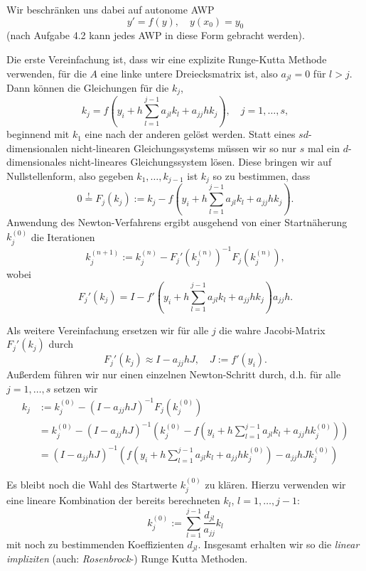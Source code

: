 \documentclass[
]{mycourse}
\theoremstyle{mythm}
\theoremstyle{break}
\begin{document}
Wir beschränken uns dabei auf autonome AWP
\[
y'=f(y), \quad y(x_0)=y_0
\]
(nach Aufgabe 4.2 kann jedes AWP in diese Form gebracht werden).

Die erste Vereinfachung ist, dass wir eine explizite Runge-Kutta Methode verwenden, für die $A$ eine linke untere Dreiecksmatrix ist, also  $a_{jl}=0$ für $l>j$. Dann können die Gleichungen für die $k_j$,
\[
k_j=f(y_i + h \sum_{l=1}^{j-1} a_{jl} k_l +  a_{jj} h k_j), \quad j=1,\ldots,s,
\]
beginnend mit $k_1$ eine nach der anderen gelöst werden. Statt eines $sd$-dimensionalen nicht-linearen
Gleichungssystems müssen wir so nur $s$ mal ein $d$-dimensionales nicht-lineares Gleichungssystem lösen.
Diese bringen wir auf Nullstellenform, also gegeben $k_1,\ldots,k_{j-1}$ ist $k_j$ so zu bestimmen, dass
\[
0\stackrel !=F_j(k_j):=k_j - f(y_i + h \sum_{l=1}^{j-1} a_{jl} k_l +  a_{jj} h k_j).
\]
Anwendung des Newton-Verfahrens ergibt ausgehend von einer Startnäherung $k_j^{(0)}$ die 
Iterationen
\[
k_j^{(n+1)}:=k_j^{(n)}-F_j'(k_j^{(n)})^{-1}F_j(k_j^{(n)}),
\]
wobei
\[
F_j'(k_j)=I- f'(y_i + h \sum_{l=1}^{j-1} a_{jl} k_l +  a_{jj} h k_j)a_{jj} h.
\]

Als weitere Vereinfachung ersetzen wir für alle $j$ die wahre Jacobi-Matrix $F_j'(k_j)$ durch 
\[
F_j'(k_j)\approx I- a_{jj} h J, \quad  J:=f'(y_i).
\] 
Außerdem führen wir nur einen einzelnen Newton-Schritt durch, d.h. für alle $j=1,\ldots, s$ setzen wir
\begin{align*}
 k_j & :=k_j^{(0)}-(I- a_{jj} h J)^{-1} F_j(k_j^{(0)})\\
&= k_j^{(0)}-(I- a_{jj} h J)^{-1} \left( k^{(0)}_j - f(y_i + h \sum_{l=1}^{j-1} a_{jl} k_l +  a_{jj} h k_j^{(0)}) \right)\\
&= (I- a_{jj} h J)^{-1} \left( f(y_i + h \sum_{l=1}^{j-1} a_{jl} k_l +  a_{jj} h k_j^{(0)}) - a_{jj} h J k_j^{(0)} \right)
\end{align*}

Es bleibt noch die Wahl des Startwerte $k_j^{(0)}$ zu klären. Hierzu verwenden wir eine 
lineare Kombination der bereits berechneten $k_l$, $l=1,\ldots,j-1$:
\[
k_j^{(0)}:=\sum_{l=1}^{j-1} \dfrac {d_{jl}}{a_{jj}} k_l
\]
mit noch zu bestimmenden Koeffizienten $d_{jl}$. Insgesamt erhalten wir so die \emph{linear impliziten} (auch: \emph{Rosenbrock}-) Runge Kutta Methoden.

\begin{center}
\end{center}
\end{document}
